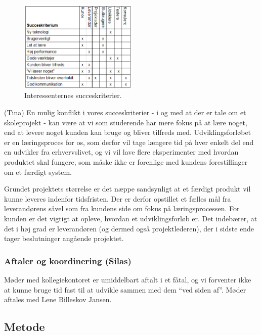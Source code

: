 \documentclass[12pt, a4paper]{report}
\begin{document}
\begin{figure}[ht!]
  \centering
  \includegraphics[width=0.5\textwidth]{succeskriterium}
  \caption{Interessenternes succeskriterier.}
\end{figure}

(Tina)
En mulig konflikt i vores succeskriterier - i og med at der er tale om et skoleprojekt - kan være at vi som studerende har mere fokus på at lære noget, end at levere noget kunden kan bruge og bliver tilfreds med. Udviklingsforløbet er en læringsproces for os, som derfor vil tage længere tid på hver enkelt del end en udvikler fra erhvervslivet, og vi vil lave flere eksperimenter med hvordan produktet skal fungere, som måske ikke er forenlige med kundens forestillinger om et færdigt system.

Grundet projektets størrelse er det næppe sandsynligt at et færdigt produkt vil kunne leveres indenfor tidsfristen. Der er derfor opstillet et fælles mål fra leverandørens såvel som fra kundens side om fokus på læringsprocessen. For kunden er det vigtigt at opleve, hvordan et udviklingsforløb er. Det indebærer, at det i høj grad er leverandøren (og dermed også projektlederen), der i sidste ende tager beslutninger angående projektet.

\subsubsection{Aftaler og koordinering (Silas)}
Møder med kollegiekontoret er umiddelbart aftalt i et fåtal, og vi forventer ikke at kunne bruge tid fast til at udvikle sammen med dem “ved siden af”. Møder aftales med Lene Billeskov Jansen.

\subsection{Metode}
\end{document}
